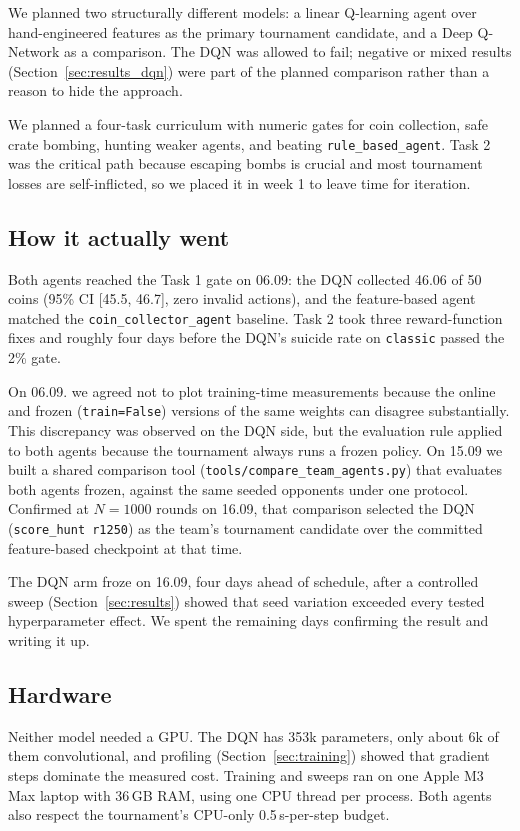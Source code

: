 \documentclass[11pt]{article}
\newcommand{\code}[1]{\texttt{#1}}
\begin{document}
We planned two structurally different models: a linear Q-learning agent over
hand-engineered features as the primary tournament candidate, and a Deep Q-Network as a
comparison. The DQN was allowed to fail; negative or mixed results
(Section~\ref{sec:results_dqn}) were part of the planned comparison rather than a reason to
hide the approach.

We planned a four-task curriculum with numeric gates for coin collection, safe crate
bombing, hunting weaker agents, and beating \code{rule\_based\_agent}. Task 2 was the
critical path because escaping bombs is crucial and most tournament losses are
self-inflicted, so we placed it in week 1 to leave time for iteration.

\subsection{How it actually went}

Both agents reached the Task 1 gate on 06.09: the DQN collected 46.06 of 50
coins (95\% CI [45.5, 46.7], zero invalid actions), and the feature-based agent matched the
\code{coin\_collector\_agent} baseline. Task 2 took three reward-function fixes and roughly
four days before the DQN's suicide rate on \code{classic} passed the 2\% gate.

On 06.09. we agreed not to plot training-time measurements because the online and frozen
(\code{train=False}) versions of the same weights can disagree substantially. This
discrepancy was observed on the DQN side, but the evaluation rule applied to both agents
because the tournament always runs a frozen policy. On 15.09 we built a shared comparison
tool
(\code{tools/compare\_team\_agents.py}) that evaluates both agents frozen, against the same
seeded opponents under one protocol. Confirmed at $N{=}1000$ rounds on 16.09, that comparison
selected the DQN
(\code{score\_hunt r1250}) as the team's tournament candidate over the committed
feature-based checkpoint at that time.

The DQN arm froze on 16.09, four days ahead of schedule, after a controlled sweep
(Section~\ref{sec:results}) showed that seed variation exceeded every tested hyperparameter
effect. We spent the remaining days confirming the result and writing it up.

\subsection{Hardware}

Neither model needed a GPU. The DQN has 353k parameters, only about 6k of them
convolutional, and profiling (Section~\ref{sec:training}) showed that gradient steps
dominate the measured cost. Training and sweeps ran on one Apple M3 Max laptop with 36\,GB
RAM, using one CPU thread per process. Both agents also respect the tournament's CPU-only
0.5\,s-per-step budget.
\end{document}
